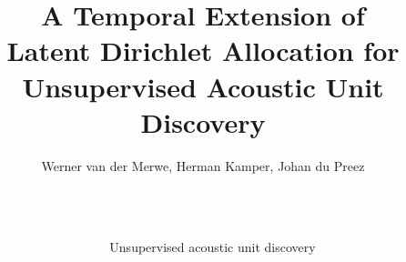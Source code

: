 \documentclass[final]{beamer}
\title{A Temporal Extension of \\Latent Dirichlet Allocation for \\Unsupervised Acoustic Unit Discovery}
\author{Werner van der Merwe, Herman Kamper, Johan du Preez}
\institute{MediaLab, E\&E Engineering, Stellenbosch University, South Africa}
\newcommand{\mybf}[1]{\textcolor{darkestgray}{\textbf{#1}}}
\newlength{\columnheight}
\begin{document}
\begin{frame}[t]
\begin{columns}[T]

\begin{column}{.01\linewidth}\end{column} %


\begin{column}{.33\linewidth}
\centering
\begin{minipage}[T]{.97\textwidth}\parbox[t][\columnheight]{\textwidth}{

\begin{block}{Unsupervised acoustic unit discovery}

    
    
        
        
    

        
        

\end{block}}
\end{minipage}
\end{column}
\end{columns}
\end{frame}
\end{document}
